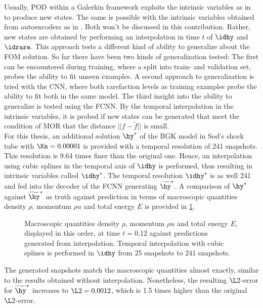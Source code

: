 Usually, POD within a Galerkin framework exploits the intrinsic variables as in \cite{Bernard} to produce new states. The same is possible with the intrinsic variables obtained from autoencoders as in \cite{Carlberg}. Both won't be discussed in this contribution. Rather, new states are obtained by performing an interpolation in time \(t\) of \(\idhy\) and \(\idrare\). This approach tests a different kind of ability to generalize about the FOM solution. So far there have been two kinds of generalization tested: The first can be encountered during training, where a split into train- and validation set, probes the ability to fit unseen examples. A second approach to generalization is tried with the CNN, where both rarefaction levels as training examples probe the ability to fit both in the same model. The third insight into the ability to generalize is tested using the FCNN. By the temporal interpolation in the intrinsic variables, it is probed if new states can be generated that meet the condition of MOR that the distance \(||f - \tilde{f}||\) is small.\\
For this thesis, an additional solution \(\hy^*\) of the BGK model in Sod's shock tube with \(\Kn=0.00001\) is provided with a temporal resolution of 241 snapshots. This resolution is 9.64 times finer than the original one. Hence, an interpolation using cubic splines in the temporal axis of \(\idhy\) is performed, thus resulting in intrinsic variables called \(\idhy^*\). The temporal resolution \(\idhy^*\) is as well 241  and fed into the decoder of the FCNN generating \(\widetilde{\hy}^*\). A comparison of \(\hy^*\) against \(\widetilde{\hy}^*\) as truth against prediction in terms of macroscopic quantities density \(\rho\), momentum \(\rho u\) and total energy \(E\) is provided in \cref{Fig: IntHy}.
\begin{figure}[H]
	
	\caption{Macroscopic quantities density \(\rho\), momentum \(\rho u\) and total energy \(E\), displayed in this order, at time \(t=0.12\) against predictions generated from interpolation. Temporal interpolation with cubic splines is performed in \(\idhy\) from 25 snapshots to 241 snapshots.}
	\label{Fig: IntHy}
\end{figure}
The generated snapshots match the macroscopic quantities almost exactly, similar to the results obtained without interpolation. Nonetheless, the resulting \(\L2\)-error for \(\widetilde{\hy}^*\) increases to \(\L2=0.0012\), which is 1.5 times higher than the original \(\L2\)-error.\\

